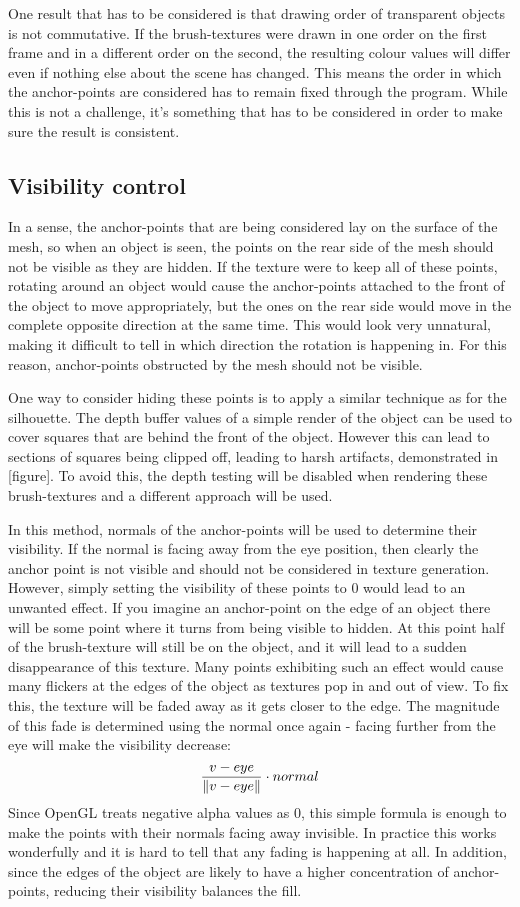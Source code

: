 \documentclass[a4paper, 12pt]{article}
\DeclarePairedDelimiter{\norm}{\lVert}{\rVert}
\begin{document}
One result that has to be considered is that drawing order of transparent objects is not commutative. If the brush-textures were drawn in one order on the first frame and in a different order on the second, the resulting colour values will differ even if nothing else about the scene has changed. This means the order in which the anchor-points are considered has to remain fixed through the program. While this is not a challenge, it's something that has to be considered in order to make sure the result is consistent.


\subsection{Visibility control}
In a sense, the anchor-points that are being considered lay on the surface of the mesh, so when an object is seen, the points on the rear side of the mesh should not be visible as they are hidden. If the texture were to keep all of these points, rotating around an object would cause the anchor-points attached to the front of the object to move appropriately, but the ones on the rear side would move in the complete opposite direction at the same time. This would look very unnatural, making it difficult to tell in which direction the rotation is happening in. For this reason, anchor-points obstructed by the mesh should not be visible.

One way to consider hiding these points is to apply a similar technique as for the silhouette. The depth buffer values of a simple render of the object can be used to cover squares that are behind the front of the object. However this can lead to sections of squares being clipped off, leading to harsh artifacts, demonstrated in [figure]. To avoid this, the depth testing will be disabled when rendering these brush-textures and a different approach will be used.

In this method, normals of the anchor-points will be used to determine their visibility. If the normal is facing away from the eye position, then clearly the anchor point is not visible and should not be considered in texture generation. However, simply setting the visibility of these points to 0 would lead to an unwanted effect. If you imagine an anchor-point on the edge of an object there will be some point where it turns from being visible to hidden. At this point half of the brush-texture will still be on the object, and it will lead to a sudden disappearance of this texture. Many points exhibiting such an effect would cause many flickers at the edges of the object as textures pop in and out of view. To fix this, the texture will be faded away as it gets closer to the edge. The magnitude of this fade is determined using the normal once again - facing further from the eye will make the visibility decrease:
$$\frac{v-eye}{\norm{v-eye}} \cdot normal$$
Since OpenGL treats negative alpha values as 0, this simple formula is enough to make the points with their normals facing away invisible. In practice this works wonderfully and it is hard to tell that any fading is happening at all. In addition, since the edges of the object are likely to have a higher concentration of anchor-points, reducing their visibility balances the fill.
\end{document}
